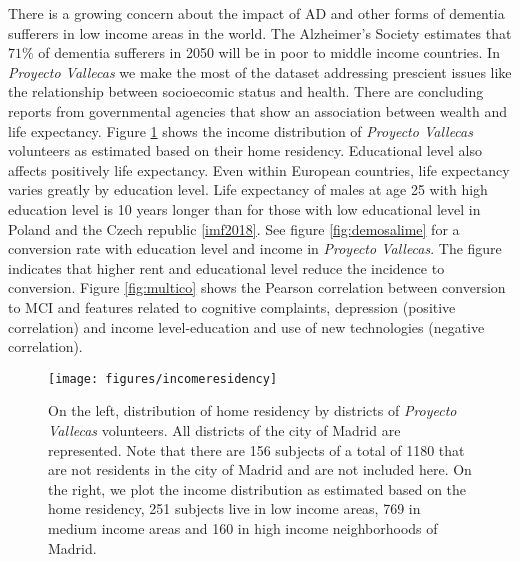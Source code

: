 \documentclass[11pt]{article}
\theoremstyle{definition}
\theoremstyle{remark}
\begin{document}
There is a growing concern about the impact of AD and other forms of dementia sufferers in low income areas in the world.
The Alzheimer’s Society estimates that $71\%$ of dementia sufferers in 2050 will be in poor to middle income countries.
In \emph{Proyecto Vallecas} we make the most of the dataset addressing prescient issues like the relationship between socioecomic status and health. There are concluding reports from governmental agencies that show an association between wealth and life expectancy. 
Figure \ref{fig:incomeresidency} shows the income distribution of \emph{Proyecto Vallecas} volunteers as estimated based on their home residency. 
Educational level also affects positively life expectancy. Even within European countries, life expectancy varies greatly by education level. Life expectancy of males at age 25 with high education level is 10 years longer than for those with low educational level in Poland and the Czech republic \ref{imf2018}. 
See figure \ref{fig:demosalime} for a conversion rate with education level and income in \emph{Proyecto Vallecas}. The figure indicates that higher rent and educational level reduce the incidence to conversion. Figure \ref{fig:multico} shows the Pearson correlation between conversion to MCI and features related to cognitive complaints, depression (positive correlation) and income level-education and use of new technologies (negative correlation).

\begin{figure}[H]
        \centering
        \texttt{[image: figures/incomeresidency]}
        \caption{On the left, distribution of home residency by districts of \emph{Proyecto Vallecas} volunteers. All districts of the city of Madrid are represented. Note that there are 156 subjects of a total of 1180 that are not residents in the city of Madrid and are not included here. On the right, we plot the income distribution as estimated based on the home residency, 251 subjects live in low income areas, 769 in medium income areas and 160 in high income neighborhoods of Madrid.
        } \label{fig:incomeresidency}
\end{figure}
\end{document}
